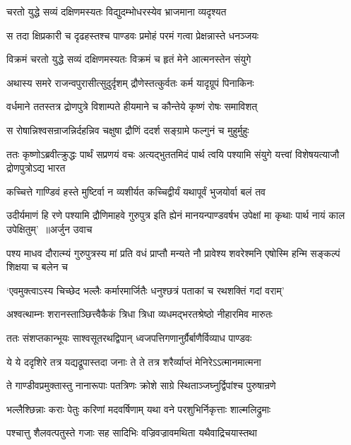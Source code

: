 \twolineshloka
{चरतो युद्धे सव्यं दक्षिणमस्यतः}
{विद्युदम्भोधरस्येव भ्राजमाना व्यदृश्यत}


\twolineshloka
{स तदा क्षिप्रकारी च दृढहस्तश्च पाण्डवः}
{प्रमोहं परमं गत्वा प्रेक्षन्नास्ते धनञ्जयः}


\twolineshloka
{विक्रमं चरतो युद्धे सव्यं दक्षिणमस्यतः}
{विक्रमं च हृतं मेने आत्मनस्तेन संयुगे}


\twolineshloka
{अथास्य समरे राजन्वपुरासीत्सुदुर्दृशम्}
{द्रौणेस्तत्कुर्वतः कर्म यादृग्रूपं पिनाकिनः}


\twolineshloka
{वर्धमाने ततस्तत्र द्रोणपुत्रे विशाम्पते}
{हीयमाने च कौन्तेये कृष्णं रोषः समाविशत्}


\twolineshloka
{स रोषान्निश्वसन्राजन्निर्दहन्निव चक्षुषा}
{द्रौणिं ददर्श सङ्ग्रामे फल्गुनं च मुहुर्मुहुः}


ततः कृष्णोऽब्रवीत्क्रुद्धः पार्थं सप्रणयं वचः
\twolineshloka
{अत्यद्भुततमिदं पार्थ त्वयि पश्यामि संयुगे}
{यत्त्वां विशेषयत्याजौ द्रोणपुत्रोऽद्य भारत}


\twolineshloka
{कच्चित्ते गाण्डिवं हस्ते मुष्टिर्वा न व्यशीर्यत}
{कच्चिद्वीर्यं यथापूर्वं भुजयोर्वा बलं तव}


\fourlineindentedshloka
{उदीर्यमाणं हि रणे पश्यामि द्रौणिमाहवे}
{गुरुपुत्र इति ह्येनं मानयन्पाण्डवर्षभ}
{उपेक्षां मा कृथाः पार्थ नायं काल उपेक्षितुम्' ॥अर्जुन उवाच}
{}


\threelineshloka
{पश्य माधव दौरात्म्यं गुरुपुत्रस्य मां प्रति}
{वधं प्राप्तौ मन्यते नौ प्रावेश्य शवरेश्मनि}
{एषोस्मि हन्मि सङ्कल्पं शिक्षया च बलेन च}


\twolineshloka
{`एवमुक्त्वाऽस्य चिच्छेद भल्लैः कर्मारमार्जितैः}
{धनुश्छत्रं पताकां च रथशक्तिं गदां वराम्'}


\twolineshloka
{अश्वत्थाम्नः शरानस्ताञ्छित्त्वैकैकं त्रिधा त्रिधा}
{व्यधमद्भरतश्रेष्ठो नीहारमिव मारुतः}


\twolineshloka
{ततः संशप्तकान्भूयः साश्वसूतरथद्विपान्}
{ध्वजपत्तिगणानुर्ग्रैर्बाणैर्विव्याध पाण्डवः}


\twolineshloka
{ये ये ददृशिरे तत्र यद्यद्रूपास्तदा जनाः}
{ते ते तत्र शरैर्व्याप्तं मेनिरेऽऽत्मानमात्मना}


\twolineshloka
{ते गाण्डीवप्रमुक्तास्तु नानारूपाः पतत्रिणः}
{क्रोशे साग्रे स्थिताञ्जघ्नुर्द्विपांश्च पुरुषान्रणे}


\twolineshloka
{भल्लैश्छिन्नाः कराः पेतुः करिणां मदवर्षिणाम्}
{यथा वने परशुभिर्निकृत्ताः शाल्मलिद्रुमाः}


\twolineshloka
{पश्चात्तु शैलवत्पतुस्ते गजाः सह सादिभिः}
{वज्रिवज्रावमथिता यथैवाद्रिचयास्तथा}


